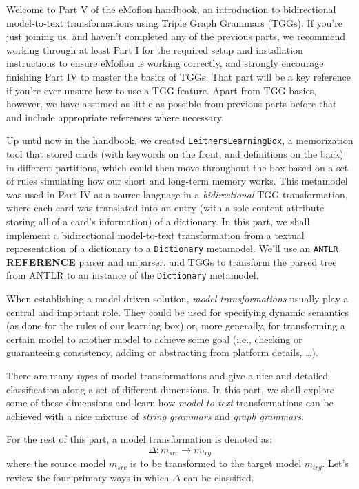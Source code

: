 \genHeader

Welcome to Part V of the eMoflon handbook, an introduction to bidirectional model-to-text transformations using Triple Graph Grammars (TGGs). If you're just
joining us, and haven't completed any of the previous parts, we recommend working through at least Part I for the required setup and installation instructions
to ensure eMoflon is working correctly, and strongly encourage finishing Part IV to master the basics of TGGs. That part will be a key reference if you're ever
unsure how to use a TGG feature. Apart from TGG basics, however, we have assumed as little as possible from previous parts before that and include appropriate
references where necessary.

Up until now in the handbook, we created \texttt{LeitnersLearningBox}, a memorization tool that stored cards (with keywords on the front, and definitions on the
back) in different partitions, which could then move throughout the box based on a set of rules simulating how our short and long-term memory works. This
metamodel was used in Part IV as a source language in a \emph{bidirectional}  TGG transformation, where each card was
translated into an entry (with a sole content attribute storing all of a card's information) of a dictionary. In this part, we shall implement a bidirectional
model-to-text transformation from a textual representation of a dictionary to a \texttt{Dictionary} metamodel.
We'll use an \texttt{ANTLR} {\bf REFERENCE } parser and unparser, and TGGs to transform the parsed tree from ANTLR to an instance of the \texttt{Dictionary}
metamodel.

When establishing a model-driven solution, \emph{model transformations} usually play a central and important role. They could be used for specifying dynamic
semantics (as done for the rules of our learning box) or, more generally, for transforming a certain model to another model to achieve some goal (i.e.,
checking or guaranteeing consistency, adding or abstracting from platform details, \ldots).

There are many \emph{types} of model transformations and \cite{CH03,Mens_Gorp_2006} give a nice and detailed classification along a set of different dimensions.
In this part, we shall explore some of these dimensions and learn how \emph{model-to-text} transformations can be achieved with a nice mixture of \emph{string
grammars} and \emph{graph grammars}.

For the rest of this part, a model transformation is denoted as:
\begin{displaymath}
 	\Delta: m_{src} \rightarrow m_{trg}
\end{displaymath}
where the source model $m_{src}$ is to be transformed to the target model $m_{trg}$. Let's review the four primary ways in which $\Delta$ can be classified.

